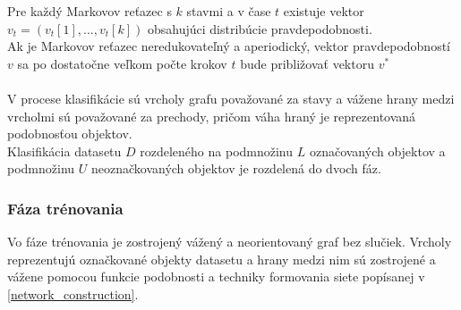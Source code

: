 \documentclass[slovak,master,dept460,male,cpp,cpdeclaration]{diploma}
\begin{document}
Pre každý Markovov reťazec s $k$ stavmi a v čase $t$ existuje vektor  $v_t =(v_t[1], . . . , v_t[k])$ obsahujúci distribúcie pravdepodobnosti. \\
Ak je Markovov reťazec neredukovateľný a aperiodický, vektor pravdepodobností $v$ sa po dostatočne veľkom počte krokov $t$ bude približovať vektoru $v^*$ 
\\\\
V procese klasifikácie sú vrcholy grafu považované za stavy a vážene hrany medzi vrcholmi sú považované za prechody, pričom váha hraný je reprezentovaná podobnosťou objektov. \\
Klasifikácia datasetu $D$  rozdeleného na podmnožinu $L$  označovaných objektov a podmnožinu $U$
neoznačkovaných objektov je rozdelená do dvoch fáz.

\subsubsection{Fáza trénovania}
Vo fáze trénovania je zostrojený vážený a neorientovaný graf bez slučiek. Vrcholy reprezentujú označkované objekty datasetu a hrany medzi nim sú zostrojené a vážene pomocou funkcie podobnosti a techniky formovania siete popísanej v \ref{network_construction}.
\end{document}
